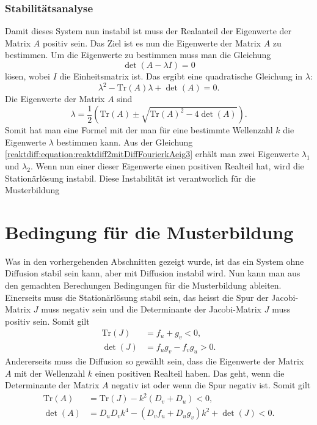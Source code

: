 \subsubsection{Stabilitätsanalyse}
Damit dieses System nun instabil ist muss der Realanteil der Eigenwerte der Matrix \(A\) positiv sein.
Das Ziel ist es nun die Eigenwerte der Matrix \(A\) zu bestimmen.
Um die Eigenwerte zu bestimmen muss man die Gleichung
\begin{equation}
    \det(A - \lambda I) = 0
\label{reaktdiff:equation:reaktdiff2mitDiffFourierkAeig}
\end{equation}
lösen, wobei \(I\) die Einheitsmatrix ist.
Das ergibt eine quadratische Gleichung in \(\lambda\):
\begin{equation}
    \lambda^2 - \text{Tr}(A) \lambda + \det(A) = 0.
\label{reaktdiff:equation:reaktdiff2mitDiffFourierkAeig2}
\end{equation}
Die Eigenwerte der Matrix \(A\) sind
\begin{equation}
    \lambda = \frac{1}{2} \left( \text{Tr}(A) \pm 
    \sqrt{\text{Tr}(A)^2 - 4 \det(A)} \right).
\label{reaktdiff:equation:reaktdiff2mitDiffFourierkAeig3}
\end{equation}
Somit hat man eine Formel mit der man für eine bestimmte Wellenzahl \(k\) die Eigenwerte \(\lambda\) bestimmen kann.
Aus der Gleichung \ref{reaktdiff:equation:reaktdiff2mitDiffFourierkAeig3} erhält man zwei Eigenwerte \(\lambda_1\) und \(\lambda_2\).
Wenn nun einer dieser Eigenwerte einen positiven Realteil hat, wird die Stationärlösung instabil.
Diese Instabilität ist verantworlich für die Musterbildung


\section{Bedingung für die Musterbildung
\label{reaktdiff:section:diffusioninduzierteInstabilitaet}}
Was in den vorhergehenden Abschnitten gezeigt wurde, ist das ein System ohne Diffusion stabil sein kann, aber mit Diffusion instabil wird.
Nun kann man aus den gemachten Berechungen Bedingungen für die Musterbildung ableiten.
Einerseits muss die Stationärlösung stabil sein, das heisst die Spur der Jacobi-Matrix \(J\) muss negativ sein und die Determinante der Jacobi-Matrix \(J\) muss positiv sein.
Somit gilt
\begin{align*}
    \text{Tr}(J) &= f_u + g_v < 0, \\
    \det(J) &= f_u g_v - f_v g_u > 0.
\end{align*}
Andererseits muss die Diffusion so gewählt sein, dass die Eigenwerte der Matrix \(A\) mit der Wellenzahl \(k\) einen positiven Realteil haben.
Das geht, wenn die Determinante der Matrix \(A\) negativ ist oder wenn die Spur negativ ist.
Somit gilt
\begin{align}
    \text{Tr}(A) &= \text{Tr}(J) - k^2(D_v + D_u)  < 0, \\
    \det(A) &= D_u D_v k^4 - (D_v f_u + D_u g_v)k^2 + \det(J) < 0.
    \label{reaktdiff:equation:reaktdiffbedingunen}
\end{align}

